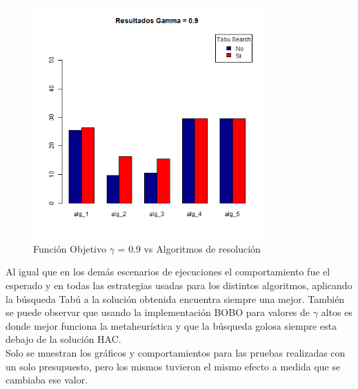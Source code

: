 \begin{figure}[H]
  \centering
    \includegraphics[width=0.8\textwidth]{resultados/cities/Graficos_agrupados/gamma09-cities.png}
  \caption{Función Objetivo $\gamma$ = $0.9$ vs Algoritmos de resolución}
  \label{res:img-cities-agr-gamma09}
\end{figure}

Al igual que en los demás escenarios de ejecuciones el comportamiento fue el esperado y en todas las estrategias usadas para los distintos algoritmos, aplicando la búsqueda Tabú a la solución obtenida encuentra siempre una mejor. También se puede observar que usando la implementación BOBO para valores de $\gamma$ altos es donde mejor funciona la metaheurística y que la búsqueda golosa siempre esta debajo de la solución HAC.\\
Solo se muestran los gráficos y comportamientos para las pruebas realizadas con un solo presupuesto, pero los mismos tuvieron el mismo efecto a medida que se cambiaba ese valor.
